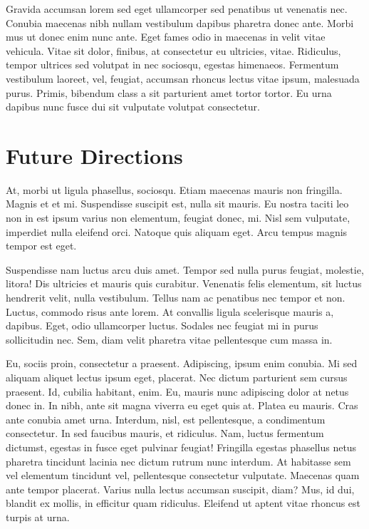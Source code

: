 \documentclass[
]{article}
\begin{document}
Gravida accumsan lorem sed eget ullamcorper sed penatibus ut venenatis
nec. Conubia maecenas nibh nullam vestibulum dapibus pharetra donec
ante. Morbi mus ut donec enim nunc ante. Eget fames odio in maecenas in
velit vitae vehicula. Vitae sit dolor, finibus, at consectetur eu
ultricies, vitae. Ridiculus, tempor ultrices sed volutpat in nec
sociosqu, egestas himenaeos. Fermentum vestibulum laoreet, vel, feugiat,
accumsan rhoncus lectus vitae ipsum, malesuada purus. Primis, bibendum
class a sit parturient amet tortor tortor. Eu urna dapibus nunc fusce
dui sit vulputate volutpat consectetur.

\hypertarget{future-directions}{%
\section{Future Directions}\label{future-directions}}

At, morbi ut ligula phasellus, sociosqu. Etiam maecenas mauris non
fringilla. Magnis et et mi. Suspendisse suscipit est, nulla sit mauris.
Eu nostra taciti leo non in est ipsum varius non elementum, feugiat
donec, mi. Nisl sem vulputate, imperdiet nulla eleifend orci. Natoque
quis aliquam eget. Arcu tempus magnis tempor est eget.

Suspendisse nam luctus arcu duis amet. Tempor sed nulla purus feugiat,
molestie, litora! Dis ultricies et mauris quis curabitur. Venenatis
felis elementum, sit luctus hendrerit velit, nulla vestibulum. Tellus
nam ac penatibus nec tempor et non. Luctus, commodo risus ante lorem. At
convallis ligula scelerisque mauris a, dapibus. Eget, odio ullamcorper
luctus. Sodales nec feugiat mi in purus sollicitudin nec. Sem, diam
velit pharetra vitae pellentesque cum massa in.

Eu, sociis proin, consectetur a praesent. Adipiscing, ipsum enim
conubia. Mi sed aliquam aliquet lectus ipsum eget, placerat. Nec dictum
parturient sem cursus praesent. Id, cubilia habitant, enim. Eu, mauris
nunc adipiscing dolor at netus donec in. In nibh, ante sit magna viverra
eu eget quis at. Platea eu mauris. Cras ante conubia amet urna.
Interdum, nisl, est pellentesque, a condimentum consectetur. In sed
faucibus mauris, et ridiculus. Nam, luctus fermentum dictumst, egestas
in fusce eget pulvinar feugiat! Fringilla egestas phasellus netus
pharetra tincidunt lacinia nec dictum rutrum nunc interdum. At habitasse
sem vel elementum tincidunt vel, pellentesque consectetur vulputate.
Maecenas quam ante tempor placerat. Varius nulla lectus accumsan
suscipit, diam? Mus, id dui, blandit ex mollis, in efficitur quam
ridiculus. Eleifend ut aptent vitae rhoncus est turpis at urna.
\end{document}
